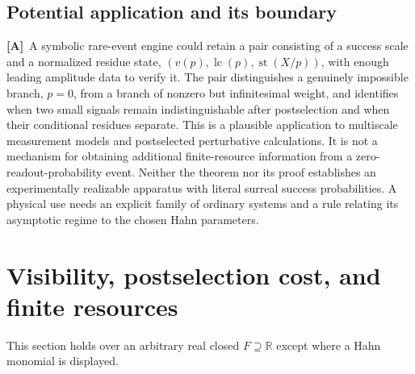 \documentclass[11pt,oneside]{article}
\numberwithin{equation}{section}
\theoremstyle{plain}
\theoremstyle{definition}
\theoremstyle{remark}
\newcommand{\R}{\mathbb R}
\DeclareMathOperator{\st}{st}
\DeclareMathOperator{\lc}{lc}
\newcommand{\TA}{\textcolor{TierA}{\textsf{\bfseries[A]}}}
\begin{document}
\subsection{Potential application and its boundary}\label{qgs:obs:sec:rareapp}
\TA\ A symbolic rare-event engine could retain a pair consisting of a success scale and a normalized residue state, $(v(p),\lc(p),\st(X/p))$, with enough leading amplitude data to verify it. The pair distinguishes a genuinely impossible branch, $p=0$, from a branch of nonzero but infinitesimal weight, and identifies when two small signals remain indistinguishable after postselection and when their conditional residues separate. This is a plausible application to multiscale measurement models and postselected perturbative calculations. It is not a mechanism for obtaining additional finite-resource information from a zero-readout-probability event. Neither the theorem nor its proof establishes an experimentally realizable apparatus with literal surreal success probabilities. A physical use needs an explicit family of ordinary systems and a rule relating its asymptotic regime to the chosen Hahn parameters.

\section{Visibility, postselection cost, and finite resources}\label{qgs:sec:cost}
This section holds over an arbitrary real closed $F\supseteq\R$ except where a Hahn monomial is displayed.
\end{document}
